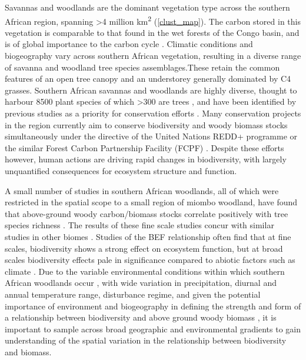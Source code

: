 \documentclass[11pt,a4paper]{article}
\newcommand{\textapprox}{\raisebox{0.5ex}{\texttildelow}}  %
\begin{document}
Savannas and woodlands are the dominant vegetation type across the southern African region, spanning >4 million km\textsuperscript{2} \citep{White1987, Ratnam2011, Ryan2016} (\autoref{clust_map}). The carbon stored in this vegetation is comparable to that found in the wet forests of the Congo basin, and is of global importance to the carbon cycle \citep{Houghton2009, Mayaux2008}. Climatic conditions and biogeography vary across southern African vegetation, resulting in a diverse range of savanna and woodland tree species assemblages.These retain the common features of an open tree canopy and an understorey generally dominated by C4 grasses. Southern African savannas and woodlands are highly diverse, thought to harbour \textapprox{}8500 plant species of which >300 are trees \citep{Frost1996}, and have been identified by previous studies as a priority for conservation efforts \citep{Byers2001, Mittermeier2003}. Many conservation projects in the region currently aim to conserve biodiversity and woody biomass stocks simultaneously under the directive of the United Nations REDD+ programme or the similar Forest Carbon Partnership Facility (FCPF) \citep{Hinsley2015}. Despite these efforts however, human actions are driving rapid changes in biodiversity, with largely unquantified consequences for ecosystem structure and function.

A small number of studies in southern African woodlands, all of which were restricted in the spatial scope to a small region of miombo woodland, have found that above-ground woody carbon/biomass stocks correlate positively with tree species richness \citep{McNicol2018, Shirima2015, Mutowo2012}. The results of these fine scale studies concur with similar studies in other biomes \citep{}. Studies of the BEF relationship often find that at fine scales, biodiversity shows a strong effect on ecosystem function, but at broad scales biodiversity effects pale in significance compared to abiotic factors such as climate \citep{Pasari2013}. Due to the variable environmental conditions within which southern African woodlands occur \citep{Frost1996}, with wide variation in precipitation, diurnal and annual temperature range, disturbance regime, and given the potential importance of environment and biogeography in defining the strength and form of a relationship between biodiversity and above ground woody biomass \citep{}, it is important to sample across broad geographic and environmental gradients to gain understanding of the spatial variation in the relationship between biodiversity and biomass. 
\end{document}
